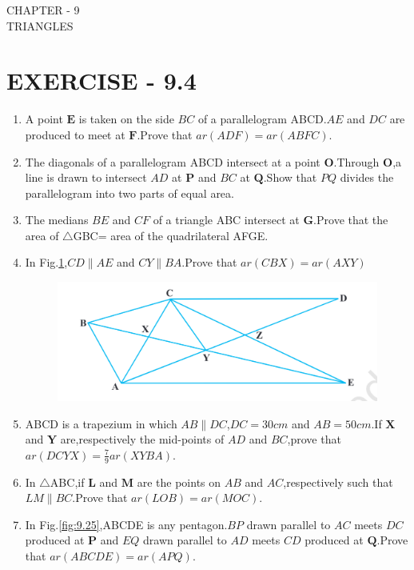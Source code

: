 \documentclass[12pt]{article}
\let\vec\mathbf
\begin{document}
\begin{center}
\textbf\large{CHAPTER - 9  \\  TRIANGLES}
\section*{EXERCISE - 9.4}
\end{center}

\begin{enumerate}

\item A point $\vec{E} $ is taken on the side $BC$ of a parallelogram ABCD.$AE$ and  $DC$ are produced to meet at $\vec{F}$.Prove that  $ar (ADF) = ar (ABFC)$.
\item The diagonals of a parallelogram ABCD intersect at a point $\vec{O}$.Through $\vec{O}$,a line is drawn to intersect $AD$ at $\vec{P}$ and $BC$ at $\vec{Q}$.Show that $PQ$ divides the parallelogram into two parts of equal area.
\item The medians $BE$ and $CF$ of a triangle ABC intersect at $\vec{G}$.Prove that the area of $ \triangle${GBC}= area of the quadrilateral AFGE.	
\item In Fig.\ref{fig:9.24},$CD \parallel AE$  and $CY \parallel BA$.Prove that  $ar (CBX) =  ar (AXY)$
\begin{figure}[h]
	\centering
	\includegraphics[width=\columnwidth]{Figs/Fig9.24.png}
	\caption{}
	\label{fig:9.24}
\end{figure}
\item ABCD is a trapezium in which $AB \parallel DC$,$DC = 30cm$  and $AB = 50cm$.If $\vec{X}$ and $\vec{Y}$ are,respectively the mid-points of $AD$ and $BC$,prove that  $ar (DCYX) = \frac{7}{9} ar (XYBA)$.
\item  In $ \triangle${ABC},if $\vec{L}$ and $\vec{M}$ are the points on $AB$ and $AC$,respectively such that $LM \parallel BC$.Prove that $ar (LOB) = ar (MOC)$.
\item In Fig.\ref{fig:9.25},ABCDE is any pentagon.$BP$ drawn parallel to $AC$ meets $DC$ produced at $\vec{P}$ and $EQ$ drawn parallel to $AD$ meets $CD$ produced at $\vec{Q}$.Prove that  $ ar (ABCDE) = ar (APQ) $.

\end{enumerate}
\end{document}
